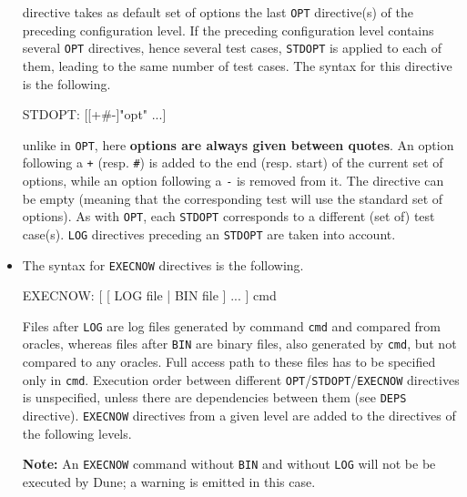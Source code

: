 \begin{itemize}
  directive takes as default set of options
  the last \texttt{OPT} directive(s) of the preceding configuration
  level. If the preceding configuration level contains several
  \texttt{OPT} directives, hence several test cases, \texttt{STDOPT}
  is applied to each of them, leading to the same number of test cases.
  The syntax for this directive is the following.
  \begin{code}
    STDOPT: [[+#-]"opt" ...]
  \end{code}
  unlike in \texttt{OPT}, here \textbf{options are always given between quotes}.
  An option following a \texttt{+}
  (resp. \texttt{\#}) is added to the end (resp. start) of the current set of
  options, while an option following a \texttt{-} is removed from it.
  The directive can be empty (meaning that the corresponding test will use the
  standard set of options). As with \texttt{OPT}, each \texttt{STDOPT}
  corresponds to a different (set of) test case(s).
  \texttt{LOG} directives preceding an \texttt{STDOPT} are taken into account.
\item The syntax for \texttt{EXECNOW}
  directives is the following.
  \begin{code}
    EXECNOW: [ [ LOG file | BIN file ] ... ] cmd
  \end{code}
  Files after \texttt{LOG} are log files generated by command \texttt{cmd} and
  compared from oracles, whereas files after \texttt{BIN} are binary files, also
  generated by \texttt{cmd}, but not compared to any oracles. Full access path to
  these files has to be specified only in \texttt{cmd}. Execution order between
  different \texttt{OPT}/\texttt{STDOPT}/\texttt{EXECNOW} directives is
  unspecified, unless there are dependencies between them (see \texttt{DEPS}
  directive).
  \texttt{EXECNOW} directives from a given level are added to the directives of
  the following levels.

  \textbf{Note:} An \texttt{EXECNOW} command without \verb|BIN| and without
  \verb|LOG| will not be be executed by Dune; a warning is emitted in this case.


\end{itemize}
